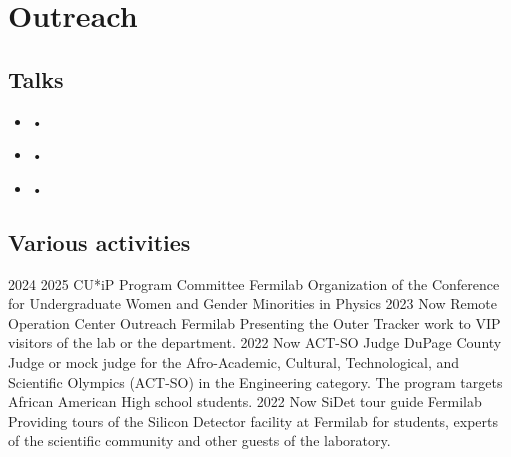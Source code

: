 \ifacademic
  \section{Outreach} %
  \subsection{Talks}
\vskip 10pt

\begin{itemize}

\item  {} • ~

\item  {} • ~

\item  {} • ~

\end{itemize}

\subsection{Various activities}
\position
      {2024 \textemdash{} 2025} 
      {CU*iP Program Committee}
      {Fermilab}
      {Organization of the Conference for Undergraduate Women and Gender Minorities in Physics}
\position
      {2023 \textemdash{} Now} 
      {Remote Operation Center Outreach}
      {Fermilab}
      {Presenting the Outer Tracker work to VIP visitors of the lab or the department.}
\position
      {2022 \textemdash{} Now} 
      {ACT-SO Judge}
      {DuPage County}
      {Judge or mock judge for the Afro-Academic, Cultural, Technological, and Scientific Olympics (ACT-SO) in the Engineering category. The program targets African American High school students.}
     \position
      {2022 \textemdash{} Now} 
      {SiDet tour guide}
      {Fermilab}
      {Providing tours of the Silicon Detector facility at Fermilab for students, experts of the scientific community and other guests of the laboratory.}

